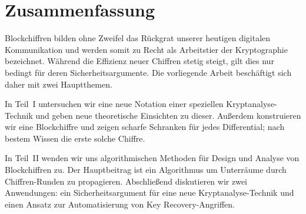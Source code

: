 \chapter*{Zusammenfassung}

Blockchiffren bilden ohne Zweifel das Rückgrat unserer heutigen digitalen Kommunikation und werden somit zu Recht als Arbeitstier der Kryptographie bezeichnet.
Während die Effizienz neuer Chiffren stetig steigt, gilt dies nur bedingt für deren Sicherheitsargumente.
Die vorliegende Arbeit beschäftigt sich daher mit zwei Hauptthemen.

In Teil~I untersuchen wir eine neue Notation einer speziellen Kryptanalyse-Technik und geben neue theoretische Einsichten zu dieser.
Außerdem konstruieren wir eine Blockchiffre und zeigen scharfe Schranken für jedes Differential; nach bestem Wissen die erste solche Chiffre.

In Teil~II wenden wir uns algorithmischen Methoden für Design und Analyse von Blockchiffren zu.
Der Hauptbeitrag ist ein Algorithmus um Unterräume durch Chiffren-Runden zu propagieren.
Abschließend diskutieren wir zwei Anwendungen: ein Sicherheitsargument für eine neue Kryptanalyse-Technik und einen Ansatz zur Automatisierung von Key Recovery-Angriffen.
